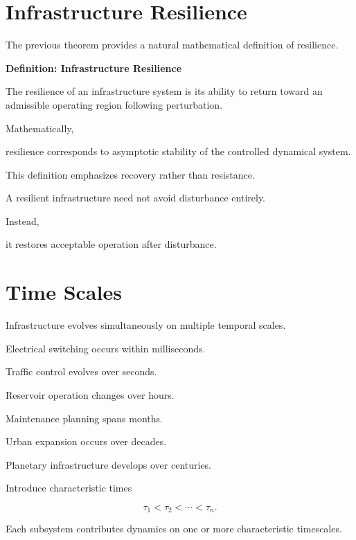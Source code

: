 \documentclass[11pt,fleqn]{book}
\numberwithin{equation}{chapter}
\newenvironment{definition}[1]
  {\begin{definitionEnv}
   \noindent\textbf{Definition: #1}\par\smallskip}
  {\end{definitionEnv}}
\theoremstyle{plain}
\theoremstyle{definition}
\theoremstyle{remark}
\begin{document}

\section{Infrastructure Resilience}

The previous theorem provides a natural mathematical definition of
resilience.


\begin{definition}{Infrastructure Resilience}

The resilience of an infrastructure system is its ability to return
toward an admissible operating region following perturbation.

Mathematically,

resilience corresponds to asymptotic stability of the controlled
dynamical system.

\end{definition}

This definition emphasizes recovery rather than resistance.

A resilient infrastructure need not avoid disturbance entirely.

Instead,

it restores acceptable operation after disturbance.


\section{Time Scales}

Infrastructure evolves simultaneously on multiple temporal scales.

Electrical switching occurs within milliseconds.

Traffic control evolves over seconds.

Reservoir operation changes over hours.

Maintenance planning spans months.

Urban expansion occurs over decades.

Planetary infrastructure develops over centuries.

Introduce characteristic times

\[
\tau_1
<
\tau_2
<
\cdots
<
\tau_n.
\]

Each subsystem contributes dynamics on one or more characteristic
timescales.
\end{document}
